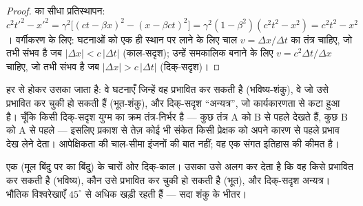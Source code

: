 \begin{proof}
 का सीधा प्रतिस्थापन:
$c^2t'^2 - x'^2 = \gamma^2\big[(ct - \beta x)^2 - (x - \beta ct)^2
\big] = \gamma^2(1 - \beta^2)(c^2t^2 - x^2) = c^2t^2 - x^2$।
वर्गीकरण के लिए: घटनाओं को एक ही स्थान पर लाने के लिए चाल
$v = \Delta x/\Delta t$ का तंत्र चाहिए, जो तभी संभव है जब $|\Delta x| <
c\,|\Delta t|$ (काल-सदृश); उन्हें समकालिक बनाने के लिए $v =
c^2\Delta t/\Delta x$ चाहिए, जो तभी संभव है जब $|\Delta x| > c\,|\Delta t|$
(दिक्-सदृश)।
\end{proof}

\begin{remark}[कार्यकारणता की एक ज्यामिति है]\label{rem:b3:relativistic-kinematics:causality}
हर  से होकर उसका \emph{} जाता है: वे घटनाएँ जिन्हें वह
प्रभावित कर सकती है (भविष्य-शंकु), वे जो उसे प्रभावित कर चुकी हो सकती
हैं (भूत-शंकु), और दिक्-सदृश ``अन्यत्र'', जो कार्यकारणता से कटा हुआ
है। चूँकि किसी दिक्-सदृश युग्म का क्रम तंत्र-निर्भर है --- कुछ तंत्र
A को B से पहले देखते हैं, कुछ B को A से पहले --- इसलिए प्रकाश से तेज़
कोई भी संकेत किसी प्रेक्षक को अपने कारण से पहले प्रभाव देख लेने देता।
आपेक्षिकता की चाल-सीमा इंजनों की बात नहीं; वह एक संगत इतिहास की कीमत है।
\end{remark}

\begin{omfigure}

{\small एक  (मूल बिंदु पर का बिंदु) के चारों ओर दिक्-काल। उसका  उसे अलग कर देता है कि
वह किसे प्रभावित कर सकती है (भविष्य), कौन उसे प्रभावित कर चुकी हो सकती
है (भूत), और दिक्-सदृश अन्यत्र। भौतिक विश्वरेखाएँ $45^\circ$ से अधिक
खड़ी रहती हैं --- सदा शंकु के भीतर।}
\end{omfigure}

